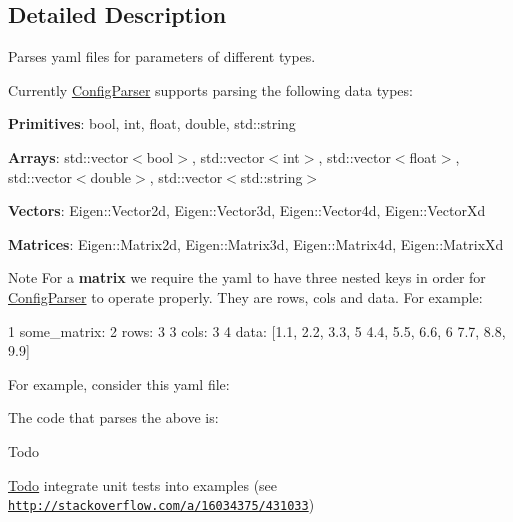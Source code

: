 \subsection{Detailed Description}
Parses yaml files for parameters of different types.

Currently {\ttfamily \hyperlink{classbeam_1_1_config_parser}{Config\+Parser}} supports parsing the following data types\+:
\begin{DoxyItemize}
\item {\bfseries Primitives}\+: {\ttfamily bool}, {\ttfamily int}, {\ttfamily float}, {\ttfamily double}, {\ttfamily std\+::string}
\item {\bfseries Arrays}\+: {\ttfamily std\+::vector$<$bool$>$}, {\ttfamily std\+::vector$<$int$>$}, {\ttfamily std\+::vector$<$float$>$}, {\ttfamily std\+::vector$<$double$>$}, {\ttfamily std\+::vector$<$std\+::string$>$}
\item {\bfseries Vectors}\+: {\ttfamily Eigen\+::\+Vector2d}, {\ttfamily Eigen\+::\+Vector3d}, {\ttfamily Eigen\+::\+Vector4d}, {\ttfamily Eigen\+::\+Vector\+Xd}
\item {\bfseries Matrices}\+: {\ttfamily Eigen\+::\+Matrix2d}, {\ttfamily Eigen\+::\+Matrix3d}, {\ttfamily Eigen\+::\+Matrix4d}, {\ttfamily Eigen\+::\+Matrix\+Xd}
\end{DoxyItemize}

\begin{DoxyNote}{Note}
For a {\bfseries matrix} we require the yaml to have three nested keys in order for {\ttfamily \hyperlink{classbeam_1_1_config_parser}{Config\+Parser}} to operate properly. They are {\ttfamily rows}, {\ttfamily cols} and {\ttfamily data}. For example\+: 
\begin{DoxyCode}
1 some\_matrix:
2   rows: 3
3   cols: 3
4   data: [1.1, 2.2, 3.3,
5          4.4, 5.5, 6.6,
6          7.7, 8.8, 9.9]
\end{DoxyCode}

\end{DoxyNote}
For example, consider this yaml file\+: 
\begin{DoxyCodeInclude}
\end{DoxyCodeInclude}


The code that parses the above is\+: 
\begin{DoxyCodeInclude}
\end{DoxyCodeInclude}


\begin{DoxyRefDesc}{Todo}
\item[\hyperlink{todo__todo000001}{Todo}]integrate unit tests into examples (see \href{http://stackoverflow.com/a/16034375/431033}{\tt http\+://stackoverflow.\+com/a/16034375/431033}) \end{DoxyRefDesc}


